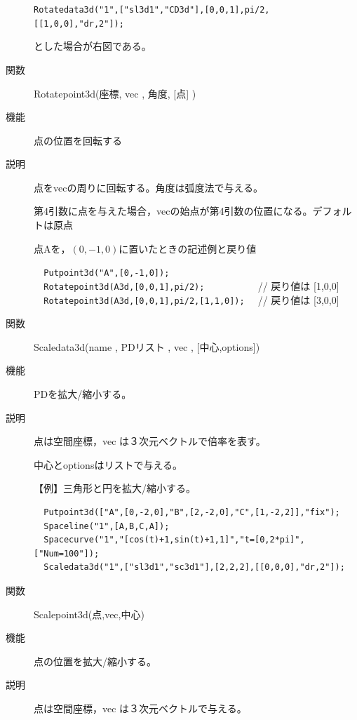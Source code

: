 \documentclass[papersize,a4paper,12pt,uplatex]{jsarticle}
\begin{document}
\begin{description}
  \verb|Rotatedata3d("1",["sl3d1","CD3d"],[0,0,1],pi/2,[[1,0,0],"dr,2"]);|
  
とした場合が右図である。

  \hspace{5mm}  

\vspace{\baselineskip}
\hypertarget{rotatepoint3d}{}
\item[関数]  Rotatepoint3d(座標, vec , 角度, [点] )
\item[機能]  点の位置を回転する
\item[説明]  点をvecの周りに回転する。角度は弧度法で与える。

第4引数に点を与えた場合，vecの始点が第4引数の位置になる。デフォルトは原点

点Aを，$(0,-1,0)$に置いたときの記述例と戻り値
 
\verb|  Putpoint3d("A",[0,-1,0]);| \\
\verb|  Rotatepoint3d(A3d,[0,0,1],pi/2);          |  // 戻り値は [1,0,0]\\
\verb|  Rotatepoint3d(A3d,[0,0,1],pi/2,[1,1,0]);  | // 戻り値は [3,0,0]\\
 
\vspace{\baselineskip}
\hypertarget{scaledata3d}{}
\item[関数]  Scaledata3d(name , PDリスト , vec , [中心,options])
\item[機能]  PDを拡大/縮小する。
\item[説明]  点は空間座標，vec は３次元ベクトルで倍率を表す。

中心とoptionsはリストで与える。

\vspace{\baselineskip}
【例】三角形と円を拡大/縮小する。

\begin{verbatim}
  Putpoint3d(["A",[0,-2,0],"B",[2,-2,0],"C",[1,-2,2]],"fix");
  Spaceline("1",[A,B,C,A]);
  Spacecurve("1","[cos(t)+1,sin(t)+1,1]","t=[0,2*pi]",["Num=100"]);
  Scaledata3d("1",["sl3d1","sc3d1"],[2,2,2],[[0,0,0],"dr,2"]);
\end{verbatim}

\hspace{20mm}

\vspace{\baselineskip}
\hypertarget{scalepoint3d}{}
\item[関数]  Scalepoint3d(点,vec,中心)
\item[機能]  点の位置を拡大/縮小する。
\item[説明]  点は空間座標，vec は３次元ベクトルで与える。


\end{description}
\end{document}
